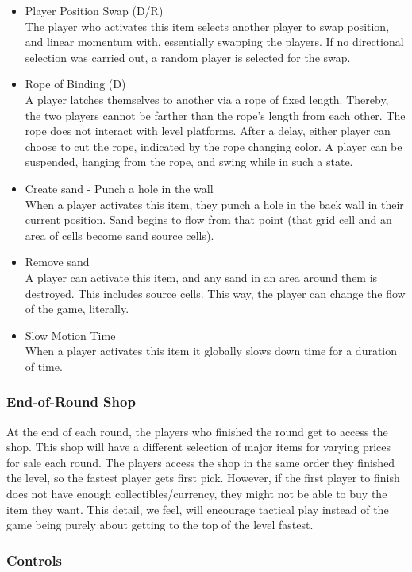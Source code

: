 \begin{itemize}
    \item Player Position Swap (D/R)\\
The player who activates this item selects another player to swap position, and linear momentum with, essentially swapping the players. If no directional selection was carried out, a random player is selected for the swap.
    \item Rope of Binding (D)\\
A player latches themselves to another via a rope of fixed length. Thereby, the two players cannot be farther than the rope’s length from each other.
The rope does not interact with level platforms.
After a delay, either player can choose to cut the rope, indicated by the rope changing color.
A player can be suspended, hanging from the rope, and swing while in such a state.
    \item Create sand - Punch a hole in the wall\\
When a player activates this item, they punch a hole in the back wall in their current position. Sand begins to flow from that point (that grid cell and an area of cells become sand source cells). 
    \item Remove sand\\
A player can activate this item, and any sand in an area around them is destroyed. This includes source cells. This way, the player can change the flow of the game, literally.
    \item Slow Motion Time\\
When a player activates this item it globally slows down time for a duration of time.
\end{itemize}

\subsubsection{End-of-Round Shop}
At the end of each round, the players who finished the round get to access the shop. This shop will have a different selection of major items for varying prices for sale each round. The players access the shop in the same order they finished the level, so the fastest player gets first pick. However, if the first player to finish does not have enough collectibles/currency, they might not be able to buy the item they want. This detail, we feel, will encourage tactical play instead of the game being purely about getting to the top of the level fastest.

\subsubsection{Controls}

